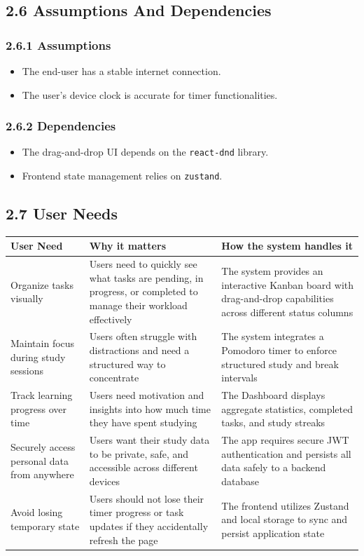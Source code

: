 \documentclass[12pt]{article}
\begin{document}
\subsection*{2.6 Assumptions And Dependencies}
\subsubsection*{2.6.1 Assumptions}
\begin{itemize}
    \item The end-user has a stable internet connection.
    \item The user's device clock is accurate for timer functionalities.
\end{itemize}
\subsubsection*{2.6.2 Dependencies}
\begin{itemize}
    \item The drag-and-drop UI depends on the \texttt{react-dnd} library.
    \item Frontend state management relies on \texttt{zustand}.
\end{itemize}

\subsection*{2.7 User Needs}

\vspace{0.3cm}
\noindent
\renewcommand{\arraystretch}{1.5}
\begin{xltabular}{\textwidth}{|p{4.5cm}|X|X|}
\hline
\textbf{User Need} & \textbf{Why it matters} & \textbf{How the system handles it} \\ \hline
Organize tasks visually & Users need to quickly see what tasks are pending, in progress, or completed to manage their workload effectively & The system provides an interactive Kanban board with drag-and-drop capabilities across different status columns \\ \hline
Maintain focus during study sessions & Users often struggle with distractions and need a structured way to concentrate & The system integrates a Pomodoro timer to enforce structured study and break intervals \\ \hline
Track learning progress over time & Users need motivation and insights into how much time they have spent studying & The Dashboard displays aggregate statistics, completed tasks, and study streaks \\ \hline
Securely access personal data from anywhere & Users want their study data to be private, safe, and accessible across different devices & The app requires secure JWT authentication and persists all data safely to a backend database \\ \hline
Avoid losing temporary state & Users should not lose their timer progress or task updates if they accidentally refresh the page & The frontend utilizes Zustand and local storage to sync and persist application state \\ \hline
\end{xltabular}
\vspace{0.3cm}
\end{document}
